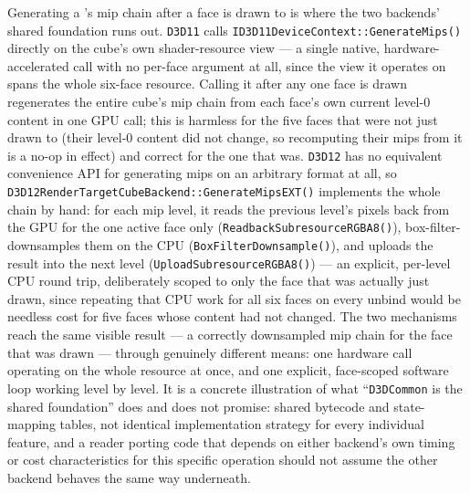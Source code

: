 Generating a 's mip chain after a face is drawn to is where the two
backends' shared foundation runs out. \texttt{D3D11} calls
\texttt{ID3D11DeviceContext::GenerateMips()} directly on the cube's own shader-resource view ---
a single native, hardware-accelerated call with no per-face argument at all, since the view it
operates on spans the whole six-face resource. Calling it after any one face is drawn
regenerates the entire cube's mip chain from each face's own current level-0 content in one GPU
call; this is harmless for the five faces that were not just drawn to (their level-0 content did
not change, so recomputing their mips from it is a no-op in effect) and correct for the one that
was. \texttt{D3D12} has no equivalent convenience API for generating mips on an arbitrary format
at all, so \texttt{D3D12RenderTargetCubeBackend::GenerateMipsEXT()} implements the whole chain by
hand: for each mip level, it reads the previous level's pixels back from the GPU for the one
active face only (\texttt{ReadbackSubresourceRGBA8()}), box-filter-downsamples them on the CPU
(\texttt{BoxFilterDownsample()}), and uploads the result into the next level
(\texttt{UploadSubresourceRGBA8()}) --- an explicit, per-level CPU round trip, deliberately scoped
to only the face that was actually just drawn, since repeating that CPU work for all six faces on
every unbind would be needless cost for five faces whose content had not changed. The two
mechanisms reach the same visible result --- a correctly downsampled mip chain for the face that
was drawn --- through genuinely different means: one hardware call operating on the whole
resource at once, and one explicit, face-scoped software loop working level by level. It is a
concrete illustration of what ``\texttt{D3DCommon} is the shared foundation'' does and does not
promise: shared bytecode and state-mapping tables, not identical implementation strategy for
every individual feature, and a reader porting code that depends on either backend's own timing
or cost characteristics for this specific operation should not assume the other backend behaves
the same way underneath.
